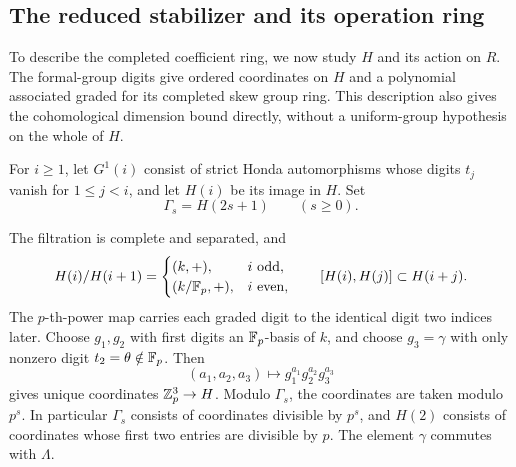 \subsection{The reduced stabilizer and its operation ring}

To describe the completed coefficient ring, we now study $H$ and its
action on $R$.  The formal-group digits give ordered coordinates on
$H$ and a polynomial associated graded for its completed skew group
ring.  This description also gives the cohomological dimension bound
directly, without a uniform-group hypothesis on the whole of $H$.

For $i\geq1$, let $G^1(i)$ consist of strict Honda automorphisms
whose digits $t_j$ vanish for $1\leq j<i$, and let $H(i)$ be its
image in $H$.  Set
\[
 \Gamma_s=H(2s+1)\qquad(s\geq0).
\]

\begin{lemma}\label{geom:group-filtration}
The filtration is complete and separated, and
\begin{equation}\label{geom:group-graded}
 H(i)/H(i+1)=
 \begin{cases}
 (k,+),&i\text{ odd},\\
 (k/\mathbb F_p,+),&i\text{ even},
 \end{cases}
 \qquad [H(i),H(j)]\subset H(i+j).
\end{equation}
The $p$-th-power map carries each graded digit to the identical digit
two indices later.  Choose $g_1,g_2$ with first digits an $\mathbb F_p$-basis
of $k$, and choose $g_3=\gamma$ with only nonzero digit
$t_2=\theta\notin\mathbb F_p$.  Then
\[
 (a_1,a_2,a_3)\longmapsto g_1^{a_1}g_2^{a_2}g_3^{a_3}
\]
gives unique coordinates $\mathbb Z_p^3\to H$.  Modulo $\Gamma_s$, the
coordinates are taken modulo $p^s$.  In particular $\Gamma_s$
consists of coordinates divisible by $p^s$, and $H(2)$ consists of
coordinates whose first two entries are divisible by $p$.
The element $\gamma$ commutes with $\Lambda$.
\end{lemma}

